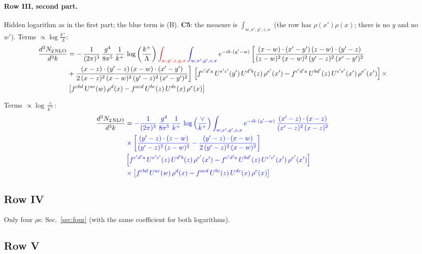 \documentclass[10pt]{article}
\numberwithin{equation}{section}
\newcommand{\new}[1]{{\color{blue}#1}}
\newcommand{\old}[1]{{\color{red}#1}}
\newcommand{\nc}{\color{blue}}
\begin{document}
\paragraph{Row III, second part.}
Hidden logarithm as in the first part; the \new{blue} term is (B). \textbf{C5}: the measure is $\int_{w,x',y',z,x}$ (the row has $\rho(x')\rho(x)$; there is no $y$ and no $w'$).
\noindent Terms $\propto\log\frac{k^+}{\Lambda}$:
\begin{align}
 \frac{d^{3}N_{2\,\rm NLO}}{d^{3}k} & =    -\, \frac{1}{(2\pi)^{3}}\,\frac{g^{4}}{8\pi^{5}}\,\frac{1}{k^{+}}\,\log{\left(\frac{k^{+}}{\Lambda}\right)}\,\old{\int_{w,y',z,y,x}}\,\new{\int_{w,x',y',z,x}}\, e^{-ik\cdot (y'-w)}\,\bigg[\frac{(x-w)\cdot (x'-y')\,(z-w)\cdot (y'-z)}{(z-w)^{2}\,(x-w)^{2}\,(y'-z)^{2}\,(x'-y')^{2}}\notag \\ & +\frac{(x-z)\cdot (y'-z)\,(x-w)\cdot (x'-y')}{2\,(x-z)^{2}\,(x-w)^{2}\,(y'-z)^{2}\,(x'-y')^{2}}\bigg]\, \left[f^{c'd'a}\,U^{e'c'}(y')\,U^{d'b}(z)\,\rho^{e'}(x')-f^{c'd'a}\, 
    U^{bd'}(z)\,U^{c'e'}(x')\,\rho^{e'}(x')\right]\times\notag \\ &  \left[f^{cbd}\,U^{ac}(w)\,\rho^{d}(x) -f^{acd}\,U^{bc}(z)\,U^{de}(x)\,\rho^{e}(x)\right] \label{eq:J:G3III2}
\end{align}

\noindent Terms $\propto\log\frac{\vee}{k^+}$:
\begin{align}
 \frac{d^{3}N_{2\,\rm NLO}}{d^{3}k} & =  \nc -\frac{1}{(2\pi)^{3}}\,\frac{g^{4}}{8\pi^{5}}\,\frac{1}{k^{+}}\,\log{\left(\frac{\vee}{k^{+}}\right)}\int_{w,x',y',z,x} e^{-ik\cdot (y'-w)}\,\frac{(x'-z)\cdot (x-z)}{(x'-z)^{2}\,(x-z)^{2}}\notag \\
& \nc  \times\bigg[\frac{(y'-z)\cdot (z-w)}{(y'-z)^{2}\,(z-w)^{2}}-\frac{(y'-z)\cdot (x-w)}{2\,(y'-z)^{2}\,(x-w)^{2}}\bigg]\notag \\
& \nc  \left[f^{c'd'a}\,U^{e'c'}(z)\,U^{d'b}(z)\,\rho^{e'}(x')-f^{c'd'a}\, U^{bd'}(z)\,U^{c'e'}(x')\,\rho^{e'}(x')\right]\notag \\
& \nc  \times\left[f^{cbd}\,U^{ac}(w)\,\rho^{d}(x) -f^{acd}\,U^{bc}(z)\,U^{de}(x)\,\rho^{e}(x)\right] \label{eq:B:G3III2}
\end{align}

\subsection{Row IV}
Only four $\rho$\textquotesingle s: Sec.~\ref{sec:four} (with the same coefficient for both logarithms).
\subsection{Row V}
\end{document}

